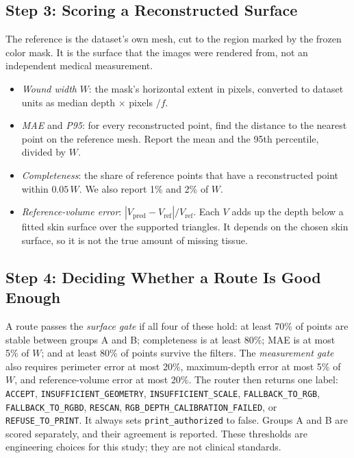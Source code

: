 \documentclass[conference]{IEEEtran}
\begin{document}
\subsection{Step 3: Scoring a Reconstructed Surface}

The reference is the dataset's own mesh, cut to the region marked by the
frozen color mask. It is the surface that the images were rendered from,
not an independent medical measurement.
\begin{itemize}
\item \emph{Wound width} $W$: the mask's horizontal extent in pixels,
converted to dataset units as median depth $\times$ pixels $/ f$.
\item \emph{MAE} and \emph{P95}: for every reconstructed point, find the
distance to the nearest point on the reference mesh. Report the mean
and the 95th percentile, divided by $W$.
\item \emph{Completeness}: the share of reference points that have a
reconstructed point within $0.05\,W$. We also report 1\% and 2\% of $W$.
\item \emph{Reference-volume error}: $|V_\text{pred}-V_\text{ref}|/V_\text{ref}$.
Each $V$ adds up the depth below a fitted skin surface over the supported
triangles. It depends on the chosen skin surface, so it is not the true
amount of missing tissue.
\end{itemize}

\subsection{Step 4: Deciding Whether a Route Is Good Enough}

A route passes the \emph{surface gate} if all four of these hold: at least
70\% of points are stable between groups A and B; completeness is at least
80\%; MAE is at most 5\% of $W$; and at least 80\% of points survive the
filters. The \emph{measurement gate} also requires perimeter error at most
20\%, maximum-depth error at most 5\% of $W$, and reference-volume error at
most 20\%. The router then returns one label: \texttt{ACCEPT},
\texttt{INSUFFICIENT\_GEOMETRY}, \texttt{INSUFFICIENT\_SCALE},
\texttt{FALLBACK\_TO\_RGB}, \texttt{FALLBACK\_TO\_RGBD},
\texttt{RESCAN}, \texttt{RGB\_DEPTH\_CALIBRATION\_FAILED}, or
\texttt{REFUSE\_TO\_PRINT}. It always sets \texttt{print\_authorized} to
false. Groups A and B are scored separately, and their agreement is
reported. These thresholds are engineering choices for this study; they
are not clinical standards.
\end{document}
